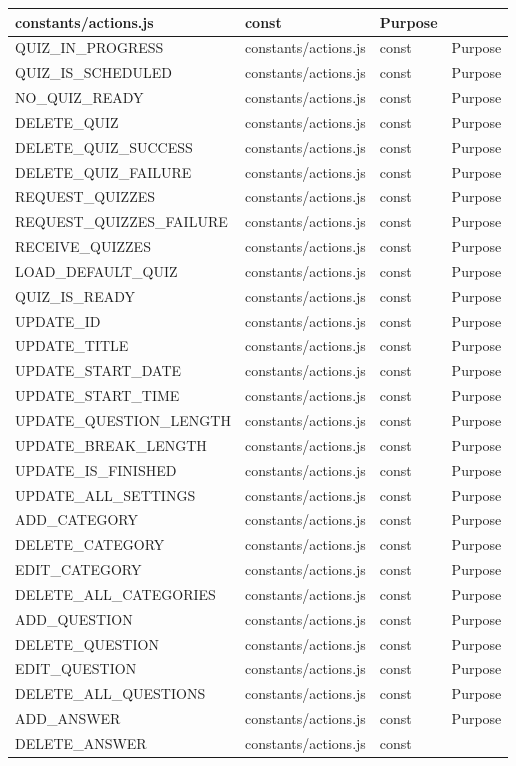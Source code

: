 \begin{table}[]
\begin{tabular}{|l|l|l|l|}
constants/actions.js & const & Purpose \\ \hline QUIZ\_IN\_PROGRESS & constants/actions.js & const & Purpose \\ \hline QUIZ\_IS\_SCHEDULED & constants/actions.js & const & Purpose \\ \hline NO\_QUIZ\_READY & constants/actions.js & const & Purpose \\ \hline DELETE\_QUIZ & constants/actions.js & const & Purpose \\ \hline DELETE\_QUIZ\_SUCCESS & constants/actions.js & const & Purpose \\ \hline DELETE\_QUIZ\_FAILURE & constants/actions.js & const & Purpose \\ \hline REQUEST\_QUIZZES & constants/actions.js & const & Purpose \\ \hline REQUEST\_QUIZZES\_FAILURE & constants/actions.js & const & Purpose \\ \hline RECEIVE\_QUIZZES & constants/actions.js & const & Purpose \\ \hline LOAD\_DEFAULT\_QUIZ & constants/actions.js & const & Purpose \\ \hline QUIZ\_IS\_READY & constants/actions.js & const & Purpose \\ \hline UPDATE\_ID & constants/actions.js & const & Purpose \\ \hline UPDATE\_TITLE & constants/actions.js & const & Purpose \\ \hline UPDATE\_START\_DATE & constants/actions.js & const & Purpose \\ \hline UPDATE\_START\_TIME & constants/actions.js & const & Purpose \\ \hline UPDATE\_QUESTION\_LENGTH & constants/actions.js & const & Purpose \\ \hline UPDATE\_BREAK\_LENGTH & constants/actions.js & const & Purpose \\ \hline UPDATE\_IS\_FINISHED & constants/actions.js & const & Purpose \\ \hline UPDATE\_ALL\_SETTINGS & constants/actions.js & const & Purpose \\ \hline ADD\_CATEGORY & constants/actions.js & const & Purpose \\ \hline DELETE\_CATEGORY & constants/actions.js & const & Purpose \\ \hline EDIT\_CATEGORY & constants/actions.js & const & Purpose \\ \hline DELETE\_ALL\_CATEGORIES & constants/actions.js & const & Purpose \\ \hline ADD\_QUESTION & constants/actions.js & const & Purpose \\ \hline DELETE\_QUESTION & constants/actions.js & const & Purpose \\ \hline EDIT\_QUESTION & constants/actions.js & const & Purpose \\ \hline DELETE\_ALL\_QUESTIONS & constants/actions.js & const & Purpose \\ \hline ADD\_ANSWER & constants/actions.js & const & Purpose \\ \hline DELETE\_ANSWER & constants/actions.js & const & 
\end{tabular}
\end{table}
